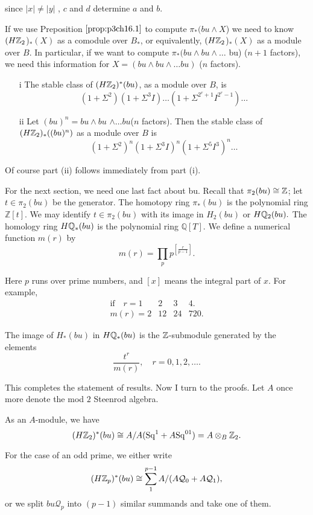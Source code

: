 \documentclass[../main]{subfiles}
\begin{document}
since $|x| \neq |y|$ , $c$ and $d$ determine $a$ and $b$.

If we use Preposition $\ref{prop:p3ch16.1}$ to compute $\pi_{\ast}(bu  \wedge X$) we need to know $(H\mathbb{Z}_2$)$_{\ast}(X)$ as a comodule over $B_{\ast}$, or equivalently, $(H\mathbb{Z}_2$)$_{\ast}(X)$ as a module over $B$. In particular, if we want to compute $\pi_{\ast}(bu \wedge bu \wedge\dots$ bu) ($n+1$ factors), we need this information for $X=(bu \wedge bu \wedge\dots bu )$ ($n$ factors).

\begin{proposition} \label{prop:p3ch16.4}\mbox{} %
\begin{enumerate}
    \item[i] The stable class of $(H\mathbb{Z}_2)^{\ast}(bu)$, as a module over $B$, is
    \[ (1+\Sigma^{2})(1+\Sigma^{3}I)\dots(1+\Sigma^{2^{r}+1}I^{2^{r}-1})\dots \]
\item[ii] Let $(bu)^{n}=bu \wedge bu$ $\wedge\dots bu$($n$ factors). Then the stable class
of $(H\mathbb{Z}_2)_{\ast}((bu)^{n})$ as a module over $B$ is $$
    (1+\Sigma^{2})^{n}(1+\Sigma^{3}I)^{n}(1+\Sigma^{5}I^{3})^{n}\dots
$$
\end{enumerate}
Of course part (ii) follows immediately from part (i).
\end{proposition}

For the next section, we need one last fact about bu. Recall that $\pi_{2}(bu)\cong \mathbb{Z}$; let $t\in \pi_{2}(bu)$ be the generator. The homotopy ring  $\pi_{\ast}(bu)$ is the polynomial ring $\mathbb Z[t]$. We may identify $t\in \pi_{2}(bu) $ with its image in $H_{2}(bu)$ or $H\mathbb{Q}_{2}(bu).$ The homology ring $H\mathbb{Q}_{\ast}(bu)$ is the polynomial ring $\mathbb Q[T]$. We define a numerical function $m(r)$ by $$
    m(r)= \prod_{p}p^{\left[\frac{r}{p-1}\right]}.
$$

Here $p$ runs over prime numbers, and $[x]$ means the integral part of $x$. For example,
\[ \begin{matrix}
\text{if}\quad  r=1 & 2 & 3 & 4.\\
m(r)=2 & 12 & 24 & 720.
\end{matrix} \]
    
\begin{proposition} \label{prop:p3ch16.5} The image of $H_{\ast}(bu)$ in $H\mathbb{Q}_{\ast}(bu)$ is the $\mathbb{Z}$-submodule generated by the elements $$
    \frac{t^{r}}{m(r)}, \quad r=0,1,2,\dots .
$$

\end{proposition}
   This completes the statement of results. Now I turn to the proofs.
Let $A$ once more denote the mod $2$ Steenrod algebra. 
\begin{proposition} \label{prop:p3ch16.6}
    As an $A$-module, we have $$
        (H\mathbb{Z}_2)^{\ast}(bu) \cong A/A(\mathrm{Sq}^{1}+A\mathrm{Sq}^{01})=A \otimes_{B} \mathbb{Z}_2.
    $$
\end{proposition}
For the case of an odd prime, we either write $$
    (H\mathbb{Z}_{p})^{\ast}(bu) \cong \sum_{1}^{p-1} A/(A\mathcal{Q}_{0}+A\mathcal{Q}_{1}),
$$
    or we split $bu \mathcal{Q}_{p}$ into $(p-1)$ similar summands and take one of them. 
    
\end{document}
